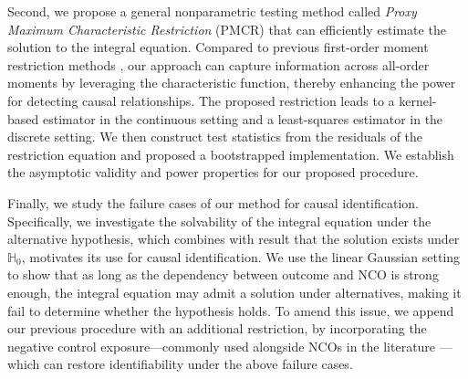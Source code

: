\documentclass[
  12pt]{article}
\def\mH{\mathbb{H}}
\begin{document}
Second, we propose a general nonparametric testing method called \emph{Proxy Maximum Characteristic Restriction} (PMCR) that can efficiently estimate the solution to the integral equation. Compared to previous first-order moment restriction methods \citep{mastouri2021proximal, kallus2021causal}, our approach can capture information across all-order moments by leveraging the characteristic function, thereby enhancing the power for detecting causal relationships. The proposed restriction leads to a kernel-based estimator in the continuous setting and a least-squares estimator in the discrete setting. We then construct test statistics from the residuals of the restriction equation and proposed a bootstrapped implementation. We establish the asymptotic validity and power properties for our proposed procedure.  




Finally, we study the failure cases of our method for causal identification. Specifically, we investigate the solvability of the integral equation under the alternative hypothesis, which combines with result that the solution exists under $\mH_0$, motivates its use for causal identification. We use the linear Gaussian setting to show that as long as the dependency between outcome and NCO is strong enough, the integral equation may admit a solution under alternatives, making it fail to determine whether the hypothesis holds. To amend this issue, we append our previous procedure with an additional restriction, by incorporating the negative control exposure—commonly used alongside NCOs in the literature \citep{miao2018identifying, eric2024proxyintro}—which can restore identifiability under the above failure cases. 
\end{document}
